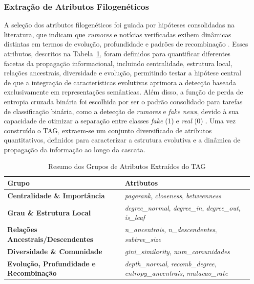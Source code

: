 \documentclass[12pt]{article}
\begin{document}
\subsubsection{Extração de Atributos Filogenéticos} \label{subsec:extracao-atributos}
A seleção dos atributos filogenéticos foi guiada por hipóteses consolidadas na literatura, que indicam que \textit{rumores} e notícias verificadas exibem dinâmicas distintas em termos de evolução, profundidade e padrões de recombinação \cite{vosoughi2018spread, peng2024infodemiology}. Esses atributos, descritos na Tabela~\ref{tab:atributos_grupos}, foram definidos para quantificar diferentes facetas da propagação informacional, incluindo centralidade, estrutura local, relações ancestrais, diversidade e evolução, permitindo testar a hipótese central de que a integração de características evolutivas aprimora a detecção baseada exclusivamente em representações semânticas. Além disso, a função de perda de entropia cruzada binária foi escolhida por ser o padrão consolidado para tarefas de classificação binária, como a detecção de \textit{rumores} e \textit{fake news}, devido à sua capacidade de otimizar a separação entre classes \textit{fake} (1) e \textit{real} (0) \cite{Goodfellow-et-al-2016}. Uma vez construído o TAG, extraem-se um conjunto diversificado de atributos quantitativos, definidos para caracterizar a estrutura evolutiva e a dinâmica de propagação da informação ao longo da cascata.

\begin{table}[htbp]
\centering
\caption{Resumo dos Grupos de Atributos Extraídos do TAG}
\label{tab:atributos_grupos}
\renewcommand{\arraystretch}{1.08}
\small
\begin{tabularx}{\linewidth}{>{\bfseries}l X}
\toprule
Grupo & Atributos \\
\midrule
Centralidade \& Importância & \textit{pagerank}, \textit{closeness}, \textit{betweenness} \\
Grau \& Estrutura Local & \textit{degree\_normal}, \textit{degree\_in}, \textit{degree\_out}, \textit{is\_leaf} \\
Relações Ancestrais/Descendentes & \textit{n\_ancentrais}, \textit{n\_descendentes}, \textit{subtree\_size} \\
Diversidade \& Comunidade & \textit{gini\_similarity}, \textit{num\_comunidades} \\
Evolução, Profundidade e Recombinação & \textit{depth\_normal}, \textit{recomb\_degree}, \textit{entropy\_ancentrais}, \textit{mutacao\_rate} \\
\bottomrule
\end{tabularx}
\end{table}
\end{document}
